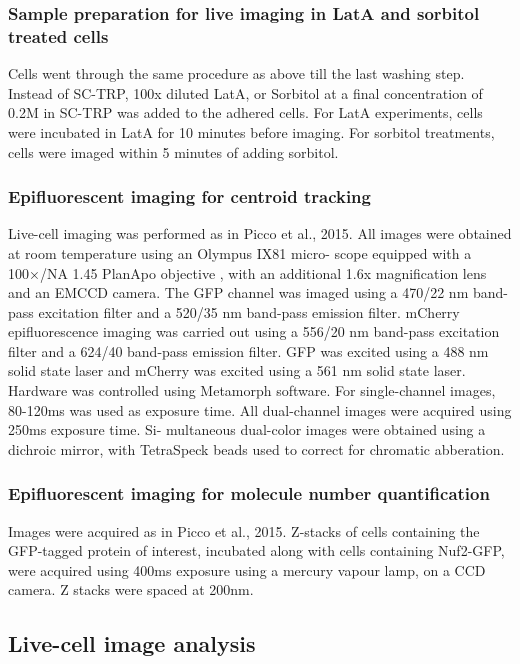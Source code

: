\documentclass[9pt,lineno]{elife}
\begin{document}
\subsubsection{Sample preparation for live imaging in LatA and sorbitol treated cells}
Cells went through the same procedure as above till the last washing step. Instead of SC-TRP, 100x diluted LatA, or Sorbitol at a final concentration of 0.2M in SC-TRP was added to the adhered cells. For LatA experiments, cells were incubated in LatA for 10 minutes before imaging. For sorbitol treatments, cells were imaged within 5 minutes of adding sorbitol.

\subsubsection{Epifluorescent imaging for centroid tracking}
Live-cell imaging was performed as in \citep{Picco2015} Picco et al., 2015. All images were obtained at room temperature using an Olympus IX81 micro- scope equipped with a 100×/NA 1.45 PlanApo objective , with an additional 1.6x magnification lens and an EMCCD camera. The GFP channel was imaged using a 470/22 nm band-pass excitation filter and a 520/35 nm band-pass emission filter. mCherry epifluorescence imaging was carried out using a 556/20 nm band-pass excitation filter and a 624/40 band-pass emission filter. GFP was excited using a 488 nm solid state laser and mCherry was excited using a 561 nm solid state laser. Hardware was controlled using Metamorph software. For single-channel images, 80-120ms was used as exposure time. All dual-channel images were acquired using 250ms exposure time. Si- multaneous dual-color images were obtained using a dichroic mirror, with TetraSpeck beads used to correct for chromatic abberation.

\subsubsection{Epifluorescent imaging for molecule number quantification}
Images were acquired as in Picco et al., 2015. Z-stacks of cells containing the GFP-tagged protein of interest, incubated along with cells containing Nuf2-GFP, were acquired using 400ms exposure using a mercury vapour lamp, on a CCD camera. Z stacks were spaced at 200nm.

\subsection{Live-cell image analysis}
\end{document}
